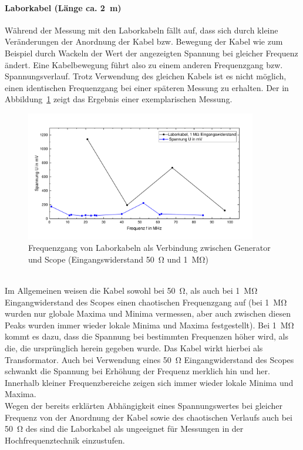 \documentclass[a4paper,twoside,final]{article}
\begin{document}
\paragraph{Laborkabel (Länge ca. \SI{2}{\metre})}
Während der Messung mit den Laborkabeln fällt auf, dass sich durch kleine Veränderungen der Anordnung der Kabel bzw. Bewegung der Kabel wie zum Beispiel durch Wackeln der Wert der angezeigten Spannung bei gleicher Frequenz ändert. Eine Kabelbewegung führt also zu einem anderen Frequenzgang bzw. Spannungsverlauf. Trotz Verwendung des gleichen Kabels ist es nicht möglich, einen identischen Frequenzgang bei einer späteren Messung zu erhalten. Der in Abbildung~\ref{fig:Frequenzgang_Laborkabel} zeigt das Ergebnis einer exemplarischen Messung.
\begin{figure}[htp]
    \centering
        \vspace{-0.5cm}
        \includegraphics[width=0.9\textwidth]{Bilder/Laborkabel_50_1MOhm.pdf}
        \vspace{-0.25cm}
    \caption{Frequenzgang von Laborkabeln als Verbindung zwischen Generator und Scope (Eingangswiderstand \SI{50}{\ohm} und \SI{1}{\mega\ohm}) }
    \label{fig:Frequenzgang_Laborkabel}
\end{figure}\\
Im Allgemeinen weisen die Kabel sowohl bei \SI{50}{\ohm}, als auch bei \SI{1}{\mega\ohm} Eingangwiderstand des Scopes einen chaotischen Frequenzgang auf (bei \SI{1}{\mega\ohm} wurden nur globale Maxima und Minima vermessen, aber auch zwischen diesen Peaks wurden immer wieder lokale Minima und Maxima festgestellt). Bei \SI{1}{\mega\ohm} kommt es dazu, dass die Spannung bei bestimmten Frequenzen höher wird, als die, die ursprünglich herein gegeben wurde. Das Kabel wirkt hierbei als Transformator.
Auch bei Verwendung eines \SI{50}{\ohm} Eingangwiderstand des Scopes schwankt die Spannung bei Erhöhung der Frequenz merklich hin und her. Innerhalb kleiner Frequenzbereiche zeigen sich immer wieder lokale Minima und Maxima.\\
Wegen der bereits erklärten Abhängigkeit eines Spannungswertes bei gleicher Frequenz von der Anordnung der Kabel sowie des chaotischen Verlaufs auch bei \SI{50}{\ohm} des sind die Laborkabel als ungeeignet für Messungen in der Hochfrequenztechnik einzustufen.
\end{document}
